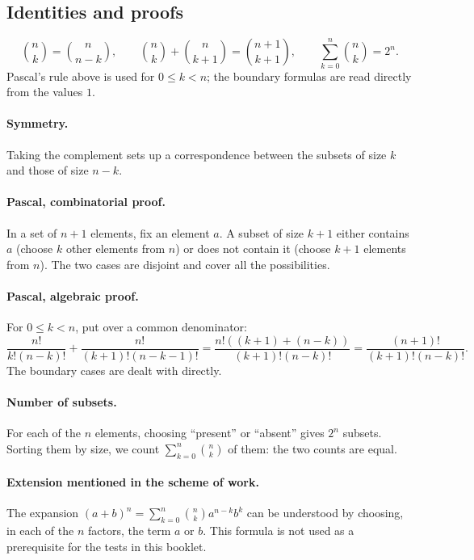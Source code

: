 \subsection{Identities and proofs}
\[\binom nk=\binom n{n-k},\qquad \binom nk+\binom n{k+1}=\binom{n+1}{k+1},\qquad\sum_{k=0}^n\binom nk=2^n.\]
Pascal's rule above is used for $0\le k<n$; the boundary formulas are read directly from the values $1$.
\paragraph{Symmetry.} Taking the complement sets up a correspondence between the subsets of size $k$ and those of size $n-k$.
\paragraph{Pascal, combinatorial proof.} In a set of $n+1$ elements, fix an element $a$. A subset of size $k+1$ either contains $a$ (choose $k$ other elements from $n$) or does not contain it (choose $k+1$ elements from $n$). The two cases are disjoint and cover all the possibilities.
\paragraph{Pascal, algebraic proof.} For $0\le k<n$, put over a common denominator:
\[\frac{n!}{k!(n-k)!}+\frac{n!}{(k+1)!(n-k-1)!}
=\frac{n!((k+1)+(n-k))}{(k+1)!(n-k)!}
=\frac{(n+1)!}{(k+1)!(n-k)!}.\]
The boundary cases are dealt with directly.
\paragraph{Number of subsets.} For each of the $n$ elements, choosing ``present'' or ``absent'' gives $2^n$ subsets. Sorting them by size, we count $\sum_{k=0}^n\binom nk$ of them: the two counts are equal.
\paragraph{Extension mentioned in the scheme of work.} The expansion $(a+b)^n=\sum_{k=0}^n\binom nk a^{n-k}b^k$ can be understood by choosing, in each of the $n$ factors, the term $a$ or $b$. This formula is not used as a prerequisite for the tests in this booklet.


